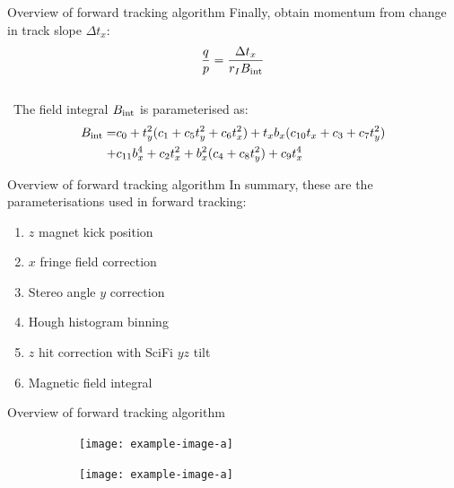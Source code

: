 \documentclass[xcolor={dvipsnames}]{beamer}
\begin{document}
\begin{frame}{Overview of forward tracking algorithm}
  \vspace{0.0cm}
  {\large Finally, obtain momentum from change in track slope $\Delta t_x$:}
  \vspace{0.2cm}
  \begin{equation*}
    \frac{q}{p} = \frac{\Delta t_x}{r_IB_{\rm int}}
  \end{equation*}
  \vspace{1.0cm}
  {\\~\large The field integral $B_{\rm int}$ is parameterised as:}
  \begin{align*}
    B_{\rm int} =& c_0 + t_y^2(c_1 + c_5t_y^2 + c_6t_x^2) + t_xb_x(c_{10}t_x + c_3 + c_7t_y^2) \\
    +& c_{11}b_x^4 + c_2t_x^2 + b_x^2(c_4 + c_8t_y^2) + c_9t_x^4
  \end{align*}
\end{frame}

\begin{frame}{Overview of forward tracking algorithm}
  \vspace{0.0cm}
  {\large In summary, these are the parameterisations used in forward tracking:}
  \vspace{0.2cm}
  \begin{enumerate}
    \setlength\itemsep{0.5em}
    \item{$z$ magnet kick position}
    \item{$x$ fringe field correction}
    \item{Stereo angle $y$ correction}
    \item{Hough histogram binning}
    \item{$z$ hit correction with SciFi $yz$ tilt}
    \item{Magnetic field integral}
  \end{enumerate}
\end{frame}

\begin{frame}{Overview of forward tracking algorithm}
  \vspace{0.0cm}
  \begin{figure}[htb]
    \centering
    \begin{subfigure}{0.42\textwidth}
      \texttt{[image: example-image-a]}
    \end{subfigure}%
    \begin{subfigure}{0.58\textwidth}
      \texttt{[image: example-image-a]}
    \end{subfigure}
    \vspace{-0.5cm}
    \caption*{}
  \end{figure}
\end{frame}
\end{document}
